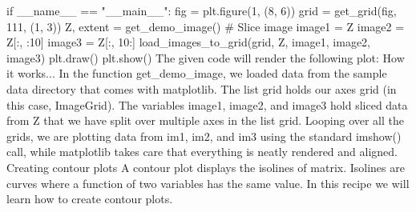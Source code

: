 if __name__ == "__main__":
 fig = plt.figure(1, (8, 6))
 grid = get_grid(fig, 111, (1, 3))
 Z, extent = get_demo_image()
 # Slice image
 image1 = Z
 image2 = Z[:, :10]
 image3 = Z[:, 10:]
 load_images_to_grid(grid, Z, image1, image2, image3)
 plt.draw()
 plt.show()
The given code will render the following plot:
How it works...
In the function get_demo_image, we loaded data from the sample data directory that comes
with matplotlib.
The list grid holds our axes grid (in this case, ImageGrid).
The variables image1, image2, and image3 hold sliced data from Z that we have split over
multiple axes in the list grid.
Looping over all the grids, we are plotting data from im1, im2, and im3 using the standard
imshow() call, while matplotlib takes care that everything is neatly rendered and aligned.
Creating contour plots
A contour plot displays the isolines of matrix. Isolines are curves where a function of two
variables has the same value.
In this recipe we will learn how to create contour plots.

